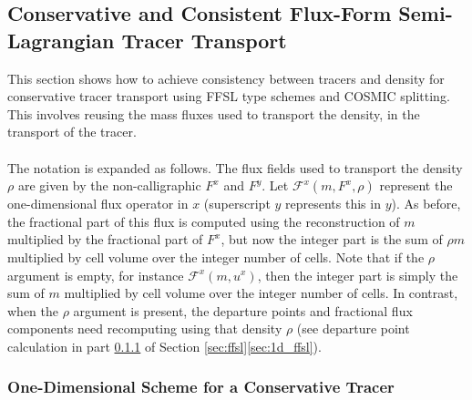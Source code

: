 \documentclass{ametsocV6.1}
\begin{document}
\subsection{Conservative and Consistent Flux-Form Semi-Lagrangian Tracer Transport} \label{sec:consistent_ffsl}

This section shows how to achieve consistency between tracers and density for conservative tracer transport using FFSL type schemes and COSMIC splitting. This involves reusing the mass fluxes used to transport the density, in the transport of the tracer. \\
\\
The notation is expanded as follows. The flux fields used to transport the density $\rho$ are given by the non-calligraphic $F^x$ and $F^y$. Let $\mathcal{F}^x(m,F^x,\rho)$ represent the one-dimensional flux operator in $x$ (superscript $y$ represents this in $y$). 
As before, the fractional part of this flux is computed using the reconstruction of $m$ multiplied by the fractional part of $F^x$, but now the integer part is the sum of $\rho m$ multiplied by cell volume over the integer number of cells.
Note that if the $\rho$ argument is empty, for instance $\mathcal{F}^x(m,u^x)$, then the integer part is simply the sum of $m$ multiplied by cell volume over the integer number of cells.
In contrast, when the $\rho$ argument is present, the departure points and fractional flux components need recomputing using that density $\rho$ (see departure point calculation in part \ref{sec:1D_tracer} of Section \ref{sec:ffsl}\ref{sec:1d_ffsl}).


\subsubsection{One-Dimensional Scheme for a Conservative Tracer} \label{sec:1D_tracer}
\end{document}
